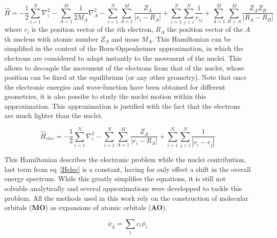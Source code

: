 \documentclass[12pt]{report}
\numberwithin{equation}{section}
\begin{document}
\begin{equation}\label{Helec}
    \hat{H}=-\frac{1}{2}\sum_{i=1}^{N}\nabla_i^2-\sum_{A=1}^{M}\frac{1}{2M_A}\nabla_A^2%
    -\sum_{i=1}^{N}\sum_{A=1}^{M}\frac{Z_A}{|r_i-R_A|}+\sum_{i=1}^{N}\sum_{j<i}^{N}\frac{1}{r_{ij}}%
    +\sum_{A=1}^{M}\sum_{B>A}^{M}\frac{Z_A Z_B}{|R_A-R_B|}
\end{equation}
where $r_i$ is the position vector of the $i$th electron, $R_A$ the position vector of the $A$th nucleus with atomic number $Z_A$ and mass $M_A$.
This Hamiltonian can be simplified in the context of the Born-Oppenheimer approximation, in which the electrons are considered to adapt instantly to the movement of the nuclei.
This allows to decouple the movement of the electrons from that of the nuclei, whose position can be fixed at the equilibrium (or any other geometry).
Note that once the electronic energies and wave-function have been obtained for different geometries, it is also possibe to study the nuclei motion within this approximation.
This approximation is justified with the fact that the electrons are much lighter than the nuclei. 

\begin{equation}\label{HBO}
    \hat{H}_{elec}=-\frac{1}{2}\sum_{i=1}^{N}\nabla_i^2%
    -\sum_{i=1}^{N}\sum_{A=1}^{M}\frac{Z_A}{|r_i-R_A|}+\sum_{i=1}^{N}\sum_{j<i}^{N}\frac{1}{|r_i-r_j|}%
\end{equation}

This Hamiltonian describes the electronic problem while the nuclei contribution, last term from eq~\ref{Helec} is a constant, having for only effect a shift in the overall energy spectrum. 
While this greatly simplifies the equations, it is still not solvable analytically and several approximations were developped to tackle this problem. %
All the methods used in this work rely on the construction of molecular orbitals (\textbf{MO}) as expansions of atomic orbitals (\textbf{AO}).

\begin{equation}
    \psi_k=\sum_{i}c_i \phi_i
\end{equation}
\end{document}
